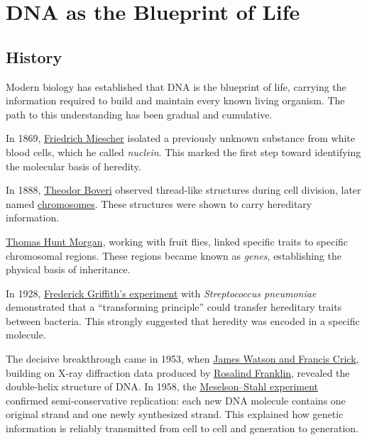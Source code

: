 \chapter{DNA as the Blueprint of Life}
\label{chap:dna-as-blueprint-of-life}

\section{History}

Modern biology has established that DNA is the blueprint of life, carrying the information required to build and maintain every known living organism.
The path to this understanding has been gradual and cumulative.

In 1869, \href{https://en.wikipedia.org/wiki/Friedrich_Miescher}{Friedrich Miescher} isolated a previously unknown substance from white blood cells, which he called \emph{nuclein}.
This marked the first step toward identifying the molecular basis of heredity.

In 1888, \href{https://en.wikipedia.org/wiki/Theodor_Boveri}{Theodor Boveri} observed thread-like structures during cell division, later named \href{https://en.wikipedia.org/wiki/Chromosome}{chromosomes}. These structures were shown to carry hereditary information.

\href{https://en.wikipedia.org/wiki/Thomas_Hunt_Morgan}{Thomas Hunt Morgan}, working with fruit flies, linked specific traits to specific chromosomal regions.
These regions became known as \emph{genes}, establishing the physical basis of inheritance.

In 1928, \href{https://en.wikipedia.org/wiki/Griffith%27s_experiment}{Frederick Griffith’s experiment} with \emph{Streptococcus pneumoniae} demonstrated that a “transforming principle” could transfer hereditary traits between bacteria. This strongly suggested that heredity was encoded in a specific molecule.

The decisive breakthrough came in 1953, when \href{https://en.wikipedia.org/wiki/James_Watson_and_Francis_Crick}{James Watson and Francis Crick}, building on X-ray diffraction data produced by \href{https://en.wikipedia.org/wiki/Rosalind_Franklin}{Rosalind Franklin}, revealed the double-helix structure of DNA. In 1958, the \href{https://en.wikipedia.org/wiki/Meselson%E2%80%93Stahl_experiment}{Meselson--Stahl experiment} confirmed semi-conservative replication: each new DNA molecule contains one original strand and one newly synthesized strand. This explained how genetic information is reliably transmitted from cell to cell and generation to generation.

